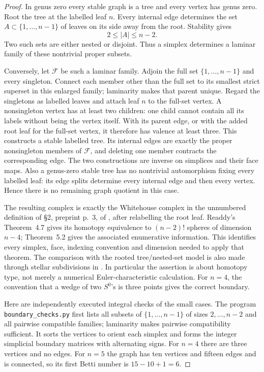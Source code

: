 \begin{proof}
In genus zero every stable graph is a tree and every vertex has genus zero. Root the tree at the labelled leaf $n$. Every internal edge determines the set $A\subset\{1,\ldots,n-1\}$ of leaves on its side away from the root. Stability gives
\[
 2\le|A|\le n-2.
\]
Two such sets are either nested or disjoint. Thus a simplex determines a laminar family of these nontrivial proper subsets.

Conversely, let $\mathcal F$ be such a laminar family. Adjoin the full set $\{1,\ldots,n-1\}$ and every singleton. Connect each member other than the full set to its smallest strict superset in this enlarged family; laminarity makes that parent unique. Regard the singletons as labelled leaves and attach leaf $n$ to the full-set vertex. A nonsingleton vertex has at least two children: one child cannot contain all its labels without being the vertex itself. With its parent edge, or with the added root leaf for the full-set vertex, it therefore has valence at least three. This constructs a stable labelled tree. Its internal edges are exactly the proper nonsingleton members of $\mathcal F$, and deleting one member contracts the corresponding edge. The two constructions are inverse on simplices and their face maps. Also a genus-zero stable tree has no nontrivial automorphism fixing every labelled leaf: its edge splits determine every internal edge and then every vertex. Hence there is no remaining graph quotient in this case.

The resulting complex is exactly the Whitehouse complex in the unnumbered definition of \S2, preprint p.~3, of \cite{Readdy2005}, after relabelling the root leaf. Readdy's Theorem~4.7 gives its homotopy equivalence to $(n-2)!$ spheres of dimension $n-4$; Theorem~5.2 gives the associated enumerative information. This identifies every simplex, face, indexing convention and dimension needed to apply that theorem. The comparison with the rooted tree/nested-set model is also made through stellar subdivisions in \cite[Theorem~3.1 and Corollary~3.2]{Feichtner2006}. In particular the assertion is about homotopy type, not merely a numerical Euler-characteristic calculation. For $n=4$, the convention that a wedge of two $S^0$'s is three points gives the correct boundary.

Here are independently executed integral checks of the small cases. The program \texttt{boundary\_checks.py} first lists all subsets of $\{1,\ldots,n-1\}$ of sizes $2,\ldots,n-2$ and all pairwise compatible families; laminarity makes pairwise compatibility sufficient. It sorts the vertices to orient each simplex and forms the integer simplicial boundary matrices with alternating signs. For $n=4$ there are three vertices and no edges. For $n=5$ the graph has ten vertices and fifteen edges and is connected, so its first Betti number is $15-10+1=6$.


\end{proof}
